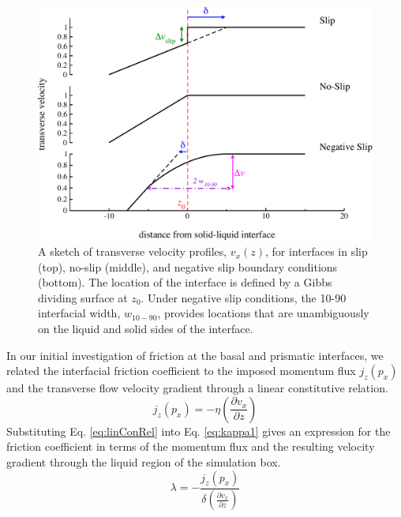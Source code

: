 \begin{figure}
\includegraphics[width=\linewidth]{Figures/slipLengthPlot}
\caption{\label{fig:slipLength} A sketch of transverse velocity
  profiles, $v_x(z)$, for interfaces in slip (top), no-slip (middle),
  and negative slip boundary conditions (bottom).  The location of the
  interface is defined by a Gibbs dividing surface at $z_0$. Under
  negative slip conditions, the 10-90 interfacial width, $w_{10-90}$,
  provides locations that are unambiguously on the liquid and solid
  sides of the interface.\label{fig:slipLengthPlot}}
\end{figure}


In our initial investigation of friction at the basal and prismatic
interfaces,\cite{Louden2013a} we related the interfacial friction
coefficient to the imposed momentum flux $j_z(p_x)$ and the transverse
flow velocity gradient through a linear constitutive relation.
\begin{equation}\label{eq:linConRel}
j_{z}(p_{x})=-\eta \left(\frac{\partial v_{x}}{\partial z}\right)
\end{equation}
Substituting Eq. \eqref{eq:linConRel} into Eq. \eqref{eq:kappa1} gives
an expression for the friction coefficient in terms of the momentum
flux and the resulting velocity gradient through the liquid region of
the simulation box.
\begin{equation}\label{eq:lambda}
\lambda=-\frac{j_{z}(p_{x})} {\delta\left(\frac{\partial v_{x}}{\partial
      z}\right) }
\end{equation}

